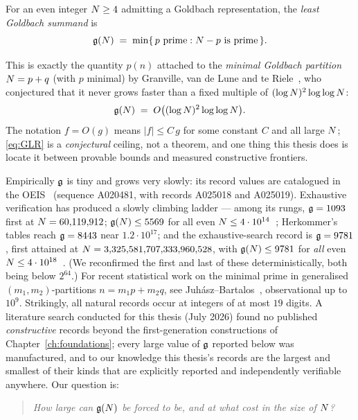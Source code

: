 \begin{definition}\label{def:g}
For an even integer $N\ge4$ admitting a Goldbach representation, the
\emph{least Goldbach summand} is
\[
\mathfrak{g}(N)\;=\;\min\{\,p\ \text{prime}:N-p\ \text{is prime}\,\}.
\]
\end{definition}

This is exactly the quantity $p(n)$ attached to the \emph{minimal
Goldbach partition} $N=p+q$ (with $p$ minimal) by Granville, van de Lune
and te Riele~\cite{GLvdtR}, who conjectured that it never grows faster
than a fixed multiple of $(\log N)^2\log\log N$:
\begin{equation}\label{eq:GLR}
\mathfrak{g}(N)\;=\;O\bigl((\log N)^2\log\log N\bigr).
\end{equation}
The notation $f=O(g)$ means $|f|\le C\,g$ for some constant $C$ and all
large $N$; \eqref{eq:GLR} is a \emph{conjectural} ceiling, not a
theorem, and one thing this thesis does is locate it between provable
bounds and measured constructive frontiers.

Empirically $\mathfrak{g}$ is tiny and grows very slowly: its record values are
catalogued in the OEIS~\cite{OEIS} (sequence A020481, with records
A025018 and A025019). Exhaustive verification has produced a slowly
climbing ladder --- among its rungs, $\mathfrak{g}=1093$ first at
$N=60{,}119{,}912$; $\mathfrak{g}(N)\le5569$ for all even
$N\le4\cdot10^{14}$~\cite{Richstein}; Herkommer's tables reach
$\mathfrak{g}=8443$ near $1.2\cdot10^{17}$; and the exhaustive-search record is
$\mathfrak{g}=9781$, first attained at $N=3{,}325{,}581{,}707{,}333{,}960{,}528$,
with $\mathfrak{g}(N)\le9781$ for \emph{all} even $N\le4\cdot10^{18}$~\cite{OeS}.
(We reconfirmed the first and last of these deterministically, both being
below $2^{64}$.) For recent statistical work on the minimal prime in
generalised $(m_1,m_2)$-partitions $n=m_1p+m_2q$, see
Juh\'asz--Bartalos~\cite{JB}, observational up to $10^9$. Strikingly,
all natural records occur at integers of at most $19$ digits. A
literature search conducted for this thesis (July 2026) found no
published \emph{constructive} records beyond the first-generation
constructions of Chapter~\ref{ch:foundations}; every large value of
$\mathfrak{g}$ reported below was manufactured, and to our knowledge this thesis's
records are the largest and smallest of their kinds that are explicitly
reported and independently verifiable anywhere. Our question is:

\begin{quote}\itshape
How large can $\mathfrak{g}(N)$ be forced to be, and at what cost in the size of
$N$?
\end{quote}

